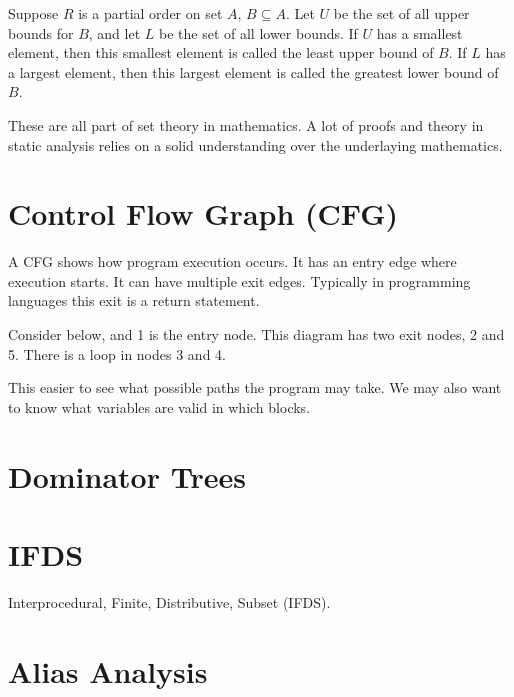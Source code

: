 Suppose $R$ is a partial order on set $A$, $B \subseteq A$. Let $U$ be the set
of all upper bounds for $B$, and let $L$ be the set of all lower bounds. If $U$
has a smallest element, then this smallest element is called the least upper
bound of $B$. If $L$ has a largest element, then this largest element is called
the greatest lower bound of $B$.

These are all part of set theory in mathematics. A lot of proofs and theory in
static analysis relies on a solid understanding over the underlaying
mathematics.

\section{Control Flow Graph (CFG)}

A CFG shows how program execution occurs. It has an entry edge where execution
starts. It can have multiple exit edges. Typically in programming languages this
exit is a return statement.

Consider below, and 1 is the entry node. This diagram has two exit nodes, 2 and
5. There is a loop in nodes 3 and 4.


This easier to see what possible paths the program may take. We may also want to
know what variables are valid in which blocks.

\section{Dominator Trees}


\section{IFDS}

Interprocedural, Finite, Distributive, Subset (IFDS).

\section{Alias Analysis}
